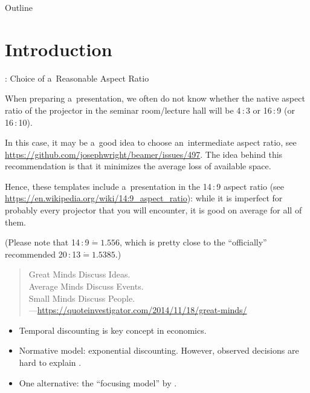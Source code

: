 \begin{frame}[standout]{Outline}

	\medskip
	\tableofcontents

\end{frame}






\section{Introduction}


\begin{frame}{\titleprefix: Choice of a~Reasonable Aspect Ratio}

	When preparing a~presentation, we often do not know whether the native aspect ratio of the projector in the seminar room/lecture hall will be 4\,:\,3 or 16\,:\,9 (or 16\,:\,10).
	
	In this case, it may be a~good idea to choose an~\alert{intermediate aspect ratio}, see \url{https://github.com/josephwright/beamer/issues/497}. The idea behind this recommendation is that it minimizes the average loss of available space.
	
	Hence, these templates include a~presentation in the \alert{14\,:\,9 aspect ratio} (see \url{https://en.wikipedia.org/wiki/14:9_aspect_ratio}): while it is imperfect for probably every projector that you will encounter, it is good on average for all of them.
	
	(Please note that 14\,:\,9${}\mathrel{\dot{=}} 1.556$, which is pretty close to the ``officially'' recommended 20\,:\,13${}\mathrel{\dot{=}} 1.5385$.)
	
\end{frame}


\begin{frame}{\titleprefix}

	\begin{quote}
		Great Minds Discuss Ideas. \\
		Average Minds Discuss Events. \\
		Small Minds Discuss People. \\
		\upshape ---\url{https://quoteinvestigator.com/2014/11/18/great-minds/}
	\end{quote}

	\begin{itemize}
		\item Temporal discounting is key concept in economics.
		\item Normative model: exponential discounting. However, observed decisions are hard to explain \citep[e.g.,][]{Dohmen2012}.
		\item One alternative: the ``focusing model'' by \cite{Koszegi2013}.
	\end{itemize}

\end{frame}


